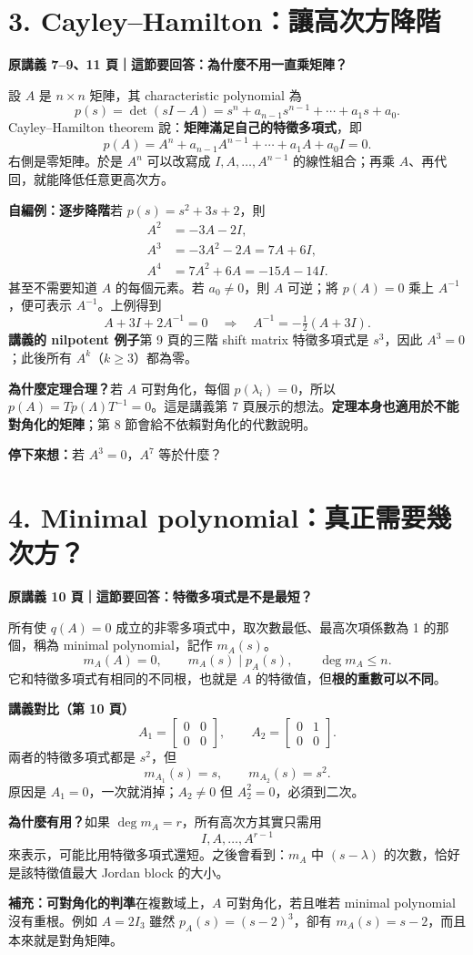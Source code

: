\documentclass[12pt,a4paper]{article}
\newcommand{\topic}[3]{\clearpage\section*{#1}\textcolor{accent}{\textbf{原講義 #2 頁｜這節要回答：#3}}\par}
\newcommand{\checkq}[1]{\par\textbf{停下來想：}#1\par}
\begin{document}
\topic{3. Cayley--Hamilton：讓高次方降階}{7--9、11}{為什麼不用一直乘矩陣？}
設 $A$ 是 $n\times n$ 矩陣，其 characteristic polynomial 為
\[
 p(s)=\det(sI-A)=s^n+a_{n-1}s^{n-1}+\cdots+a_1s+a_0.
\]
Cayley--Hamilton theorem 說：\textbf{矩陣滿足自己的特徵多項式}，即
\[
\boxed{p(A)=A^n+a_{n-1}A^{n-1}+\cdots+a_1A+a_0I=0.}
\]
右側是零矩陣。於是 $A^n$ 可以改寫成 $I,A,\ldots,A^{n-1}$ 的線性組合；再乘 $A$、再代回，就能降低任意更高次方。

\textbf{自編例：逐步降階}\quad 若 $p(s)=s^2+3s+2$，則
\begin{align*}
 A^2&=-3A-2I,\\
 A^3&=-3A^2-2A=7A+6I,\\
 A^4&=7A^2+6A=-15A-14I.
\end{align*}
甚至不需要知道 $A$ 的每個元素。若 $a_0\ne0$，則 $A$ 可逆；將 $p(A)=0$ 乘上 $A^{-1}$，便可表示 $A^{-1}$。上例得到
\[
 A+3I+2A^{-1}=0\quad\Rightarrow\quad A^{-1}=-\tfrac12(A+3I).
\]
\textbf{講義的 nilpotent 例子}\quad 第 9 頁的三階 shift matrix 特徵多項式是 $s^3$，因此 $A^3=0$；此後所有 $A^k$（$k\ge3$）都為零。

\textbf{為什麼定理合理？}\quad 若 $A$ 可對角化，每個 $p(\lambda_i)=0$，所以 $p(A)=Tp(\Lambda)T^{-1}=0$。這是講義第 7 頁展示的想法。\textbf{定理本身也適用於不能對角化的矩陣}；第 8 節會給不依賴對角化的代數說明。
\checkq{若 $A^3=0$，$A^7$ 等於什麼？}

\topic{4. Minimal polynomial：真正需要幾次方？}{10}{特徵多項式是不是最短？}
所有使 $q(A)=0$ 成立的非零多項式中，取次數最低、最高次項係數為 1 的那個，稱為 minimal polynomial，記作 $m_A(s)$。
\[
 m_A(A)=0,\qquad m_A(s)\mid p_A(s),\qquad \deg m_A\le n.
\]
它和特徵多項式有相同的不同根，也就是 $A$ 的特徵值，但\textbf{根的重數可以不同}。

\textbf{講義對比（第 10 頁）}
\[
 A_1=\begin{bmatrix}0&0\\0&0\end{bmatrix},\qquad
 A_2=\begin{bmatrix}0&1\\0&0\end{bmatrix}.
\]
兩者的特徵多項式都是 $s^2$，但
\[
 m_{A_1}(s)=s,\qquad m_{A_2}(s)=s^2.
\]
原因是 $A_1=0$，一次就消掉；$A_2\ne0$ 但 $A_2^2=0$，必須到二次。

\textbf{為什麼有用？}\quad 如果 $\deg m_A=r$，所有高次方其實只需用
\[
 I,A,\ldots,A^{r-1}
\]
來表示，可能比用特徵多項式還短。之後會看到：$m_A$ 中 $(s-\lambda)$ 的次數，恰好是該特徵值最大 Jordan block 的大小。

\textbf{補充：可對角化的判準}\quad 在複數域上，$A$ 可對角化，若且唯若 minimal polynomial 沒有重根。例如 $A=2I_3$ 雖然 $p_A(s)=(s-2)^3$，卻有 $m_A(s)=s-2$，而且本來就是對角矩陣。
\end{document}

